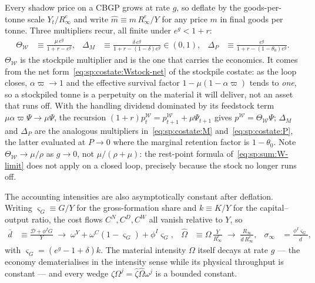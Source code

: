  Every shadow price on a CBGP grows at rate $g$, so deflate by the goods-per-tonne scale $Y_t/R^e_\infty$ and write $\hat m\equiv m\,R^e_\infty/Y$ for any price $m$ in final goods per tonne. Three multipliers recur, all finite under $e^{g}<1+r$:
\begin{align}
\Theta_{\mathcal W} &\equiv \frac{\mu\,e^{g}}{1+r-e^{g}},
&
\Delta_M &\equiv \frac{\delta\,e^{g}}{1+r-\left(1-\delta\right)e^{g}}\in\left(0,1\right),
&
\Delta_P &\equiv \frac{e^{g}}{1+r-\left(1-\theta_0\right)e^{g}} .
\label{eq:app:wh:cbgp:multipliers}
\end{align}
$\Theta_{\mathcal W}$ is the stockpile multiplier and is the one that carries the economics. It comes from the net form~\eqref{eq:sp:costate:Wstock-net} of the stockpile costate: as the loop closes, $\alpha\varpi\to1$ and the effective survival factor $1-\mu\left(1-\alpha\varpi\right)$ tends to \emph{one}, so a stockpiled tonne is a perpetuity on the material it will deliver, not an asset that runs off. With the handling dividend dominated by its feedstock term $\mu\alpha\varpi\Psi\to\mu\Psi$, the recursion $\left(1+r\right)p^{\mathcal W}_t=p^{\mathcal W}_{t+1}+\mu\Psi_{t+1}$ gives $p^{\mathcal W}=\Theta_{\mathcal W}\Psi$; $\Delta_M$ and $\Delta_P$ are the analogous multipliers in~\eqref{eq:sp:costate:M} and~\eqref{eq:sp:costate:P}, the latter evaluated at $P\to0$ where the marginal retention factor is $1-\theta_0$. Note $\Theta_{\mathcal W}\to\mu/\rho$ as $g\to0$, not $\mu/\left(\rho+\mu\right)$: the rest-point formula of~\eqref{eq:sp:sum:W-limit} does not apply on a closed loop, precisely because the stock no longer runs off.

The accounting intensities are also asymptotically constant after deflation. Writing $\varsigma_G\equiv G/Y$ for the gross-formation share and $k\equiv K/Y$ for the capital--output ratio, the cost flows $C^N,C^D,C^W$ all vanish relative to $Y$, so
\begin{align}
\bar d &\equiv \frac{\mathcal D+\phi^IG}{Y}\;\to\;\omega^Y+\omega^C\left(1-\varsigma_G\right)+\phi^I\varsigma_G,
&
\hat\Omega &\equiv \Omega\,\frac{Y}{R^e_\infty}\;\to\;\frac{R_\infty}{\bar d\,R^e_\infty},
&
\sigma_\infty &= \frac{\phi^I\varsigma_G}{\bar d},
\label{eq:app:wh:cbgp:intensities}
\end{align}
with $\varsigma_G=\left(e^{g}-1+\delta\right)k$. The material intensity $\Omega$ itself decays at rate $g$ --- the economy dematerialises in the intensity sense while its physical throughput is constant --- and every wedge $\zeta\Omega^j=\hat\zeta\hat\Omega\omega^j$ is a bounded constant.

